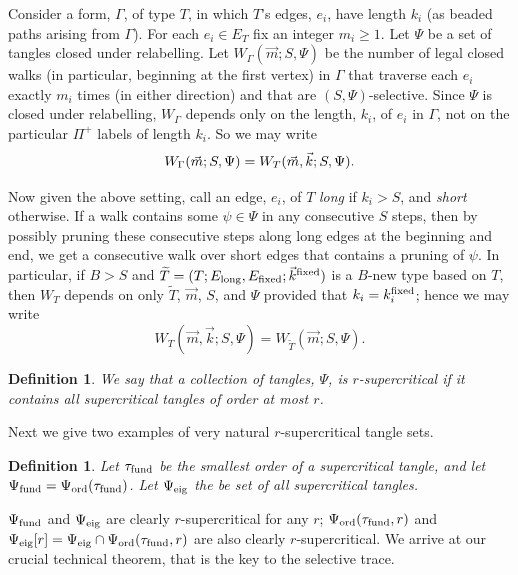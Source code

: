 \documentclass[12pt]{article}
\makeatletter
\newtheorem{definition}[theorem]{Definition}
\newcommand{\mythreeindex}[3]{\index{#1@[#2:] {#3}}}
\newcommand{\myindexW}{\mythreeindex{WGamma}{$W_\Gamma,W_T,W_{T'}$}{the
number of potential walk classes or legal walks on a form, type, or
new type with various additional restrictions (such as irreducibility)}}
\newcommand{\El}{{E_{\rm long}}}
\newcommand{\Ef}{{E_{\rm fixed}}}
\newcommand{\kf}{k^{\rm fixed}}
\newcommand{\fund}{{\rm fund}}
\newcommand{\taufund}{{\tau_\fund}}
\newcommand{\tang}{{\psi}}	%
\newcommand{\tset}{{\Psi}}
\newcommand{\tseig}{{\tset_{\rm eig}}}
\newcommand{\tsord}{{\tset_{\rm ord}}}
\newcommand{\ned}{{e}}
\makeatother
\begin{document}
Consider a form, $\Gamma$,
of type $T$, in which $T$'s edges,
$e_i$, have length $k_i$ (as beaded paths arising from $\Gamma$).
For each $e_i\in E_T$ fix an integer $m_i\ge 1$.
Let $\tset$ be a set of tangles closed under relabelling.
Let $W_\Gamma(\vec m;S,\tset)$ be the number of legal closed walks (in particular,
beginning at the first vertex) in $\Gamma$ that traverse each $e_i$ 
exactly $m_i$ times (in either direction) and that are 
$(S,\tset)$-selective.  Since $\tset$ is closed under relabelling,
$W_\Gamma$ depends only on the length, $k_i$, of $e_i$ in $\Gamma$, not
on the particular $\Pi^+$ labels of length $k_i$.  So we may write
$$
W_\Gamma(\vec m;S,\tset)=W_T(\vec m,\vec k;S,\tset)\myindexW .
$$

Now given the above setting, call an edge, $\ned_i$, of $T$ {\em long} if
$k_i>S$, and {\em short} otherwise.
If a walk contains some $\tang\in\tset$
in any consecutive $S$ steps, then by possibly pruning these
consecutive steps along long edges at the beginning and end,
we get a consecutive walk over short edges that contains a pruning of $\tang$.
In particular, if $B>S$ and $\widetilde T=(T;\El,\Ef;\vec k^{\rm fixed})$ is a 
$B$-new type based on $T$, then $W_T$ depends on only $\widetilde T$,
$\vec m$, $S$, and $\tset$ provided that $k_i=\kf_i$; hence we may write
$$
W_T(\vec m,\vec k;S,\tset)=W_{\widetilde T}(\vec m;S,\tset).
$$

\begin{definition} 
We say that a collection of tangles, $\tset$, is {\em $r$-supercritical}
if it contains all supercritical tangles of order at most $r$.
\end{definition}
Next we give two examples of very natural $r$-supercritical tangle sets.
\begin{definition}
Let $\taufund$ be the smallest order of a supercritical tangle,
and let $\tset_{\rm fund}=\tsord(\taufund)$.  Let $\tseig$ the be set of all
supercritical tangles.
\end{definition}

$\tset_{\rm fund}$ and $\tseig$ are clearly $r$-supercritical for any $r$;
$\tsord(\taufund,r)$ and $\tseig[r]=\tseig\cap\tsord(\taufund,r)$ are also
clearly $r$-supercritical.
We arrive at our crucial technical theorem, that is the key to the
selective trace.
\end{document}
